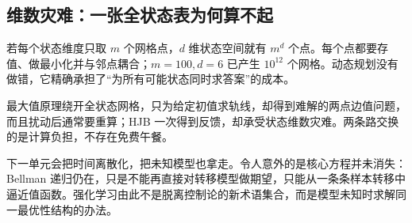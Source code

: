 \subsection{维数灾难：一张全状态表为何算不起}

若每个状态维度只取 \(m\) 个网格点，\(d\) 维状态空间就有 \(m^d\) 个点。每个点都要存值、做最小化并与邻点耦合；\(m=100,d=6\) 已产生 \(10^{12}\) 个网格。动态规划没有做错，它精确承担了``为所有可能状态同时求答案''的成本。

最大值原理绕开全状态网格，只为给定初值求轨线，却得到难解的两点边值问题，而且扰动后通常要重算；HJB 一次得到反馈，却承受状态维数灾难。两条路交换的是计算负担，不存在免费午餐。

下一单元会把时间离散化，把未知模型也拿走。令人意外的是核心方程并未消失：Bellman 递归仍在，只是不能再直接对转移模型做期望，只能从一条条样本转移中逼近值函数。强化学习由此不是脱离控制论的新术语集合，而是模型未知时求解同一最优性结构的办法。
